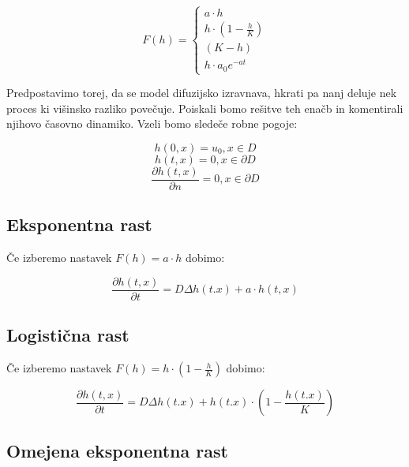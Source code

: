 \documentclass[a4paper, oneside, 12pt]{book}
\begin{document}
          \begin{equation}
            F(h) = \left \{ \begin{array}{lr} 
            a \cdot h \\
            h \cdot (1 - \frac{h}{K}) \\
            (K - h) \\
            h \cdot a_0 e^{-a t}
            \end{array} \right. 
            \label{difuzijska-variacije}
          \end{equation}

          Predpostavimo torej, da se model difuzijsko izravnava, hkrati pa nanj deluje nek proces ki višinsko razliko povečuje. Poiskali bomo rešitve teh enačb in komentirali njihovo časovno dinamiko. 
          Vzeli bomo sledeče robne pogoje:

         \[ h(0,x) = u_0, x \in D \]
         \[ h(t,x) = 0, x \in \partial D\]
         \[ \frac{\partial h(t,x)}{\partial n} = 0, x \in \partial D\]

          \subsection{Eksponentna rast}

          Če izberemo nastavek $F(h) = a \cdot h$ dobimo:

            \begin{equation}
              \frac{ \partial h(t,x) }{ \partial t} = D \Delta h(t.x) + a \cdot h(t,x)
              \label{difuzija-eksponentna-rast}
            \end{equation}

          \subsection{Logistična rast}

          Če izberemo nastavek $F(h) = h \cdot (1 - \frac{h}{K})$ dobimo:

            \begin{equation}
              \frac{ \partial h(t,x) }{ \partial t} = D \Delta h(t.x) +  h(t.x) \cdot (1 - \frac{h(t.x)}{K})
              \label{difuzija-logisticna-rast}
            \end{equation}

          \subsection{Omejena eksponentna rast}
\end{document}
